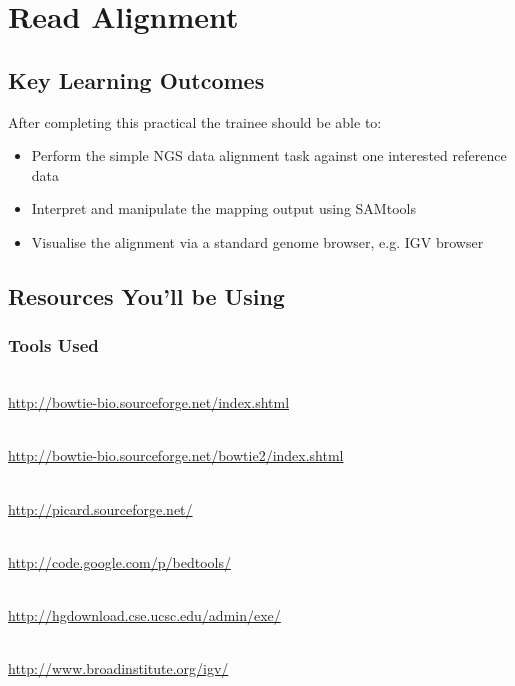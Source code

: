 \renewcommand{\moduleTitle}{Read Alignment}
\renewcommand{\moduleAuthors}{%
  Myrto Kostadima \mailto{kostadim@ebi.ac.uk}
} \renewcommand{\moduleContributions}{%
  Xi Li \mailto{sean.li@csiro.au}%
}

\chapter{\moduleTitle}
\newpage

\section{Key Learning Outcomes}

After completing this practical the trainee should be able to:
\begin{itemize}
  \item Perform the simple NGS data alignment task against one interested reference data
  \item Interpret and manipulate the mapping output using SAMtools
  \item Visualise the alignment via a standard genome browser, e.g. IGV browser
\end{itemize}

\section{Resources You'll be Using}
 
\subsection{Tools Used}
\begin{description}[style=multiline,labelindent=0cm,align=left,leftmargin=0.5cm]
  \item[Bowtie]\hfill\\
  	\url{http://bowtie-bio.sourceforge.net/index.shtml}
  \item[Bowtie 2]\hfill\\
  	\url{http://bowtie-bio.sourceforge.net/bowtie2/index.shtml}
  \item[Samtools]\hfill\\
  	\url{http://picard.sourceforge.net/}
  \item[BEDTools]\hfill\\
  	\url{http://code.google.com/p/bedtools/}
  \item[UCSC tools]\hfill\\
  	\url{http://hgdownload.cse.ucsc.edu/admin/exe/}  
  \item[IGV genome browser]\hfill\\
  	\url{http://www.broadinstitute.org/igv/}
\end{description}

